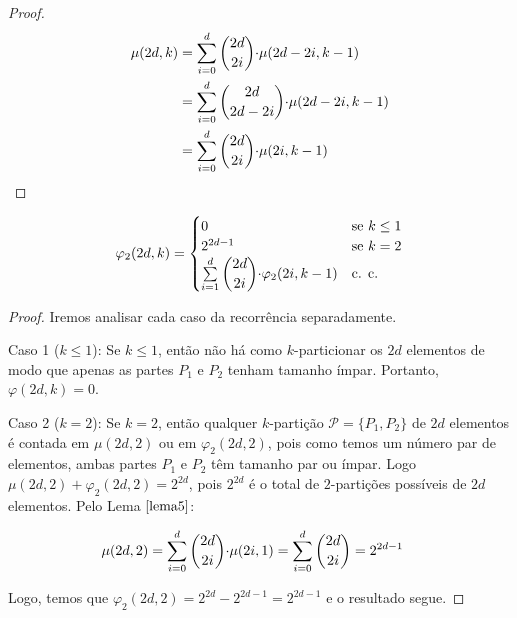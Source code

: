 \documentclass[12pt]{article}
\begin{document}
{\begin{proof}
	\begin{align}
		\begin{split}
			\mu(2d, k) &= \sum\limits_{i = 0}^{d}\escolhe{2d}{2i} {\cdot} \mu(2d - 2i, k-1) \\
			&= \sum\limits_{i = 0}^{d}\escolhe{2d}{2d - 2i} {\cdot} \mu(2d - 2i, k-1)\\
			&= \sum\limits_{i = 0}^{d}\escolhe{2d}{2i} {\cdot} \mu(2i, k-1)  
		\end{split} 
	\end{align}  
\end{proof} \newl


\begin{lema}    
	\label{lema6}
	\begin{equation}
		\varphi_2(2d, k) =
		\begin{cases}
			0 & \text{se $k \leq 1$}\\
			2^{2d - 1} & \text{se $k = 2$} \\
			\sum\limits_{i = 1}^{d} \escolhe{2d}{2i} {\cdot} \varphi_2(2i, k-1) & \text{c. c.} \\ 
		\end{cases}
	\end{equation} 
\end{lema}

\begin{proof} 
	Iremos analisar cada caso da recorrência separadamente. \newl
	
	Caso 1 ($k \leq 1$): Se $k \leq 1$, então não há como $k$-particionar os $2d$ elementos de modo que apenas as partes $P_1$ e $P_2$ tenham tamanho ímpar. Portanto, $\varphi(2d, k) = 0$. \newl
	
	Caso 2 ($k = 2$): Se $k = 2$, então qualquer $k$-partição $\mathcal{P} = \{P_1, P_2\}$ de $2d$ elementos é contada em $\mu(2d, 2)$ ou em $\varphi_2(2d, 2)$, pois como temos um número par de elementos, ambas partes $P_1$ e $P_2$ têm tamanho par ou ímpar. Logo $\mu(2d, 2) + \varphi_2(2d, 2) = 2^{2d}$, pois $2^{2d}$ é o total de $2$-partições possíveis de $2d$ elementos. Pelo Lema $\ref{lema5}$:
	
	\begin{align}
		\begin{split}
			\mu(2d, 2) &= \sum\limits_{i = 0}^{d}\escolhe{2d}{2i} {\cdot} \mu(2i, 1) = \sum\limits_{i = 0}^{d}\escolhe{2d}{2i} = 2^{2d-1}
		\end{split} 
	\end{align} 
	
	Logo, temos que $\varphi_2(2d, 2)  = 2^{2d} - 2^{2d - 1} = 2^{2d - 1}$ e o resultado segue. \newl
	

\end{proof}}
\end{document}
